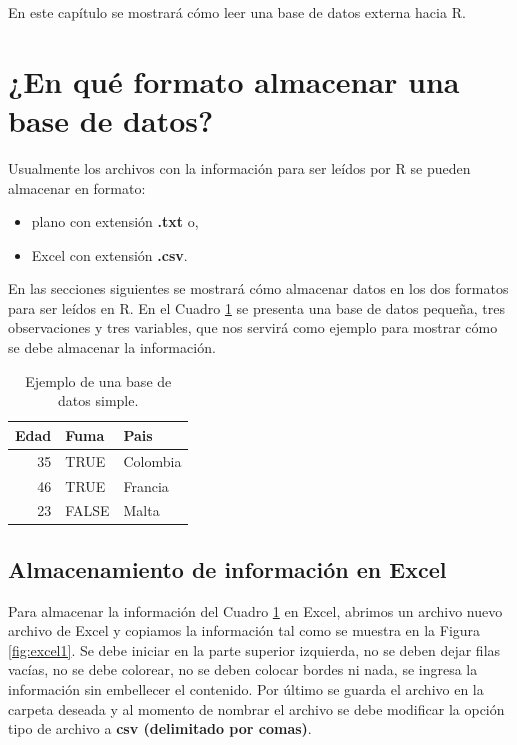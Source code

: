 \documentclass[10pt,]{krantz}
\providecommand{\tightlist}{%
  \setlength{\itemsep}{0pt}\setlength{\parskip}{0pt}}
\let\proglang=\textsf
\begin{document}
En este capítulo se mostrará cómo leer una base de datos externa hacia
\proglang{R}.

\section{\texorpdfstring{¿En qué formato almacenar una base de datos?
}{¿En qué formato almacenar una base de datos?  }}\label{en-que-formato-almacenar-una-base-de-datos}

Usualmente los archivos con la información para ser leídos por
\proglang{R} se pueden almacenar en formato:

\begin{itemize}
\tightlist
\item
  plano con extensión \textbf{.txt} o,
\item
  Excel con extensión \textbf{.csv}.
\end{itemize}

En las secciones siguientes se mostrará cómo almacenar datos en los dos
formatos para ser leídos en \proglang{R}. En el Cuadro \ref{tab:dt1} se
presenta una base de datos pequeña, tres observaciones y tres variables,
que nos servirá como ejemplo para mostrar cómo se debe almacenar la
información.

\begin{table}

\caption{\label{tab:dt1}Ejemplo de una base de datos simple.}
\centering
\begin{tabular}[t]{rll}
\toprule
Edad & Fuma & Pais\\
\midrule
35 & TRUE & Colombia\\
46 & TRUE & Francia\\
23 & FALSE & Malta\\
\bottomrule
\end{tabular}
\end{table}

\subsection{\texorpdfstring{Almacenamiento de información en Excel
}{Almacenamiento de información en Excel }}\label{almacenamiento-de-informacion-en-excel}

Para almacenar la información del Cuadro \ref{tab:dt1} en Excel, abrimos
un archivo nuevo archivo de Excel y copiamos la información tal como se
muestra en la Figura \ref{fig:excel1}. Se debe iniciar en la parte
superior izquierda, no se deben dejar filas vacías, no se debe colorear,
no se deben colocar bordes ni nada, se ingresa la información sin
embellecer el contenido. Por último se guarda el archivo en la carpeta
deseada y al momento de nombrar el archivo se debe modificar la opción
tipo de archivo a \textbf{csv (delimitado por comas)}.
\end{document}
